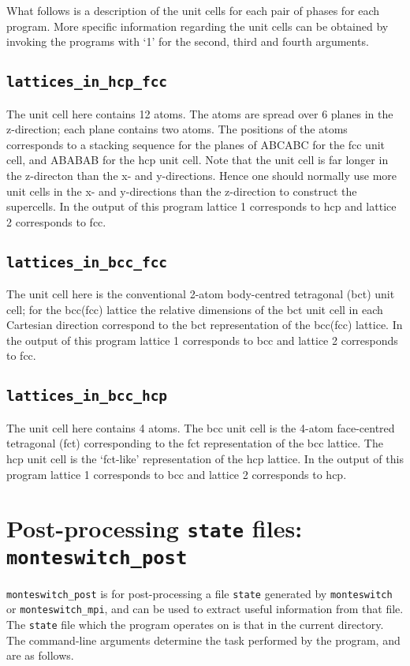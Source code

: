 \documentclass{report}
\begin{document}
What follows is a description of the unit cells for each pair of phases for each program. More specific information regarding the unit
cells can be obtained by invoking the programs with `1' for the second, third and fourth arguments. 

\subsection{\texttt{lattices\_in\_hcp\_fcc}}
The unit cell here contains 12 atoms. The atoms are spread over 6 planes in the z-direction; each plane contains two atoms. The positions
of the atoms corresponds to a stacking sequence for the planes of ABCABC for the fcc unit cell, and  ABABAB for the hcp unit cell. 
Note that the unit cell is far longer in the z-directon than the x- and y-directions. Hence one should normally use more unit cells in 
the x- and y-directions than the z-direction to construct the supercells. In the output of this program lattice 1 corresponds to hcp and
lattice 2 corresponds to fcc.

\subsection{\texttt{lattices\_in\_bcc\_fcc}}
The unit cell here is the conventional 2-atom body-centred tetragonal (bct) unit cell; for the bcc(fcc) lattice the relative dimensions of 
the bct unit cell in each Cartesian direction correspond to the bct representation of the bcc(fcc) lattice. In the output of this program
lattice 1 corresponds to bcc and lattice 2 corresponds to fcc.

\subsection{\texttt{lattices\_in\_bcc\_hcp}}
The unit cell here contains 4 atoms. The bcc unit cell is the 4-atom face-centred tetragonal (fct) corresponding to the fct representation of 
the bcc lattice. The hcp unit cell is the `fct-like' representation of the hcp lattice. In the output of this program
lattice 1 corresponds to bcc and lattice 2 corresponds to hcp.


\section{Post-processing \texttt{state} files: \texttt{monteswitch\_post}}\label{sec:monteswitch_post}
\texttt{monteswitch\_post} is for post-processing a file \texttt{state} generated by \texttt{monteswitch} or \texttt{monteswitch\_mpi}, and can
be used to extract useful information from that file. The \texttt{state} file which the program operates on is that in the current directory.
The command-line arguments determine the task performed by the program, and are as follows.
\end{document}

